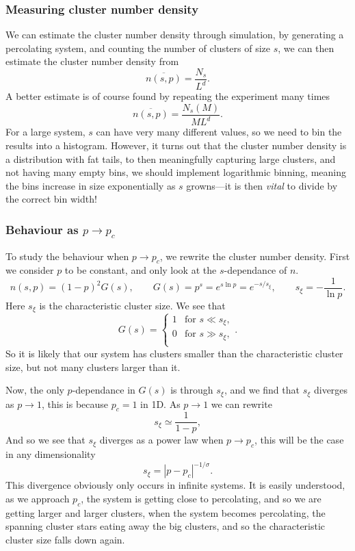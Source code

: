 \documentclass[a4paper, 11pt, notitlepage, english]{article}
\begin{document}
\subsubsection*{Measuring cluster number density}

We can estimate the cluster number density through simulation, by generating a percolating system, and counting the number of clusters of size $s$, we can then estimate the cluster number density from
$$\overline{n(s,p)} = \frac{N_s}{L^d}.$$
A better estimate is of course found by repeating the experiment many times
$$\overline{n(s,p)} = \frac{N_s(M)}{ML^d}.$$
For a large system, $s$ can have very many different values, so we need to bin the results into a histogram. However, it turns out that the cluster number density is a distribution with fat tails, to then meaningfully capturing large clusters, and not having many empty bins, we should implement logarithmic binning, meaning the bins increase in size exponentially as $s$ growns---it is then \emph{vital} to divide by the correct bin width!

\subsubsection*{Behaviour as $p \to p_c$}

To study the behaviour when $p\to p_c$, we rewrite the cluster number density. First we consider $p$ to be constant, and only look at the $s$-dependance of $n$.
$$n(s,p) = (1-p)^2 G(s), \qquad G(s) = p^s = e^{s \ln p} = e^{-s / s_\xi}, \qquad s_\xi = -\frac{1}{\ln p}.$$
Here $s_\xi$ is the characteristic cluster size. We see that
$$G(s) = \begin{cases}
	1 & \mbox{for } s \ll s_\xi, \\
	0 & \mbox{for } s \gg s_\xi, \\
\end{cases}.$$
So it is likely that our system has clusters smaller than the characteristic cluster size, but not many clusters larger than it. 

Now, the only $p$-dependance in $G(s)$ is through $s_\xi$, and we find that $s_\xi$ diverges as $p\to 1$, this is because $p_c = 1$ in 1D. As $p \to 1$ we can rewrite 
$$s_\xi \simeq \frac{1}{1-p},$$
And so we see that $s_\xi$ diverges as a power law when $p \to p_c$, this will be the case in any dimensionality
$$s_\xi = |p-p_c|^{-1/\sigma}.$$
This divergence obviously only occurs in infinite systems. It is easily understood, as we approach $p_c$, the system is getting close to percolating, and so we are getting larger and larger clusters, when the system becomes percolating, the spanning cluster stars eating away the big clusters, and so the characteristic cluster size falls down again.
\end{document}
